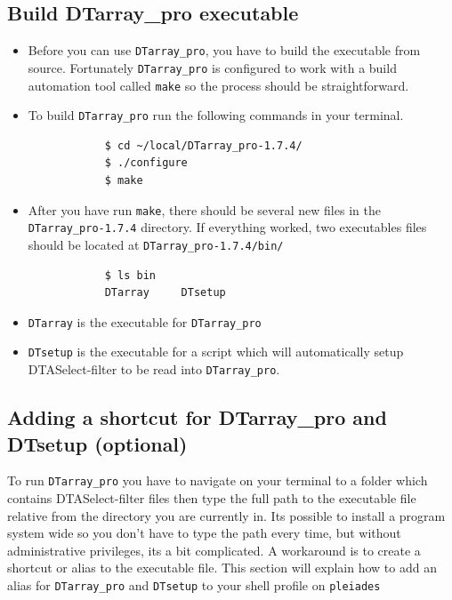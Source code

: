 \documentclass[12pt]{article}
\newcommand{\VERSION}{1.7.4}
\begin{document}
	\subsection{Build DTarray\_pro executable}
	\begin{itemize}
		\item Before you can use \texttt{DTarray\_pro}, you have to build the executable from source. Fortunately \texttt{DTarray\_pro} is configured to work with a build automation tool called \texttt{make} so the process should be straightforward.
		
		\item To build \texttt{DTarray\_pro} run the following commands in your terminal.
		
		\begin{lstlisting}
			$ cd ~/local/DTarray_pro-1.7.4/
			$ ./configure
			$ make
		\end{lstlisting}
		
		\item After you have run \texttt{make}, there should be several new files in the \texttt{DTarray\_pro-\VERSION} directory.  If everything worked, two executables files should be located at \texttt{DTarray\_pro-\VERSION/bin/}
		
		\begin{lstlisting}
			$ ls bin
			DTarray		DTsetup
		\end{lstlisting}
		
		\item \texttt{DTarray} is the executable for \texttt{DTarray\_pro}
		
		\item \texttt{DTsetup} is the executable for a script which will automatically setup DTASelect-filter to be read into \texttt{DTarray\_pro}.
		
	\end{itemize}

	\subsection{Adding a shortcut for DTarray\_pro and DTsetup (optional)}
	
	To run \texttt{DTarray\_pro} you have to navigate on your terminal to a folder which contains DTASelect-filter files then type the full path to the executable file relative from the directory you are currently in.  Its possible to install a program system wide so you don't have to type the path every time, but without administrative privileges, its a bit complicated. A workaround is to create a shortcut or alias to the executable file.  This section will explain how to add an alias for \texttt{DTarray\_pro} and \texttt{DTsetup} to your shell profile on \texttt{pleiades}
	
\end{document}
